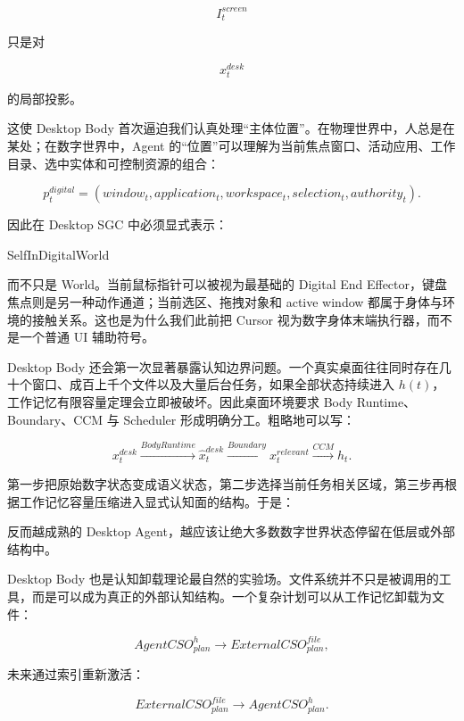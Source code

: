 $$
I_t^{screen}
$$

只是对

$$
x_t^{desk}
$$

的局部投影。

这使 Desktop Body 首次逼迫我们认真处理“主体位置”。在物理世界中，人总是在某处；在数字世界中，Agent 的“位置”可以理解为当前焦点窗口、活动应用、工作目录、选中实体和可控制资源的组合：

$$
p_t^{digital}
=
(
window_t,
application_t,
workspace_t,
selection_t,
authority_t
).
$$

因此在 Desktop SGC 中必须显式表示：

\begin{statementbox}
SelfInDigitalWorld
\end{statementbox}

而不只是 World。当前鼠标指针可以被视为最基础的 Digital End Effector，键盘焦点则是另一种动作通道；当前选区、拖拽对象和 active window 都属于身体与环境的接触关系。这也是为什么我们此前把 Cursor 视为数字身体末端执行器，而不是一个普通 UI 辅助符号。

Desktop Body 还会第一次显著暴露认知边界问题。一个真实桌面往往同时存在几十个窗口、成百上千个文件以及大量后台任务，如果全部状态持续进入 $h(t)$，工作记忆有限容量定理会立即被破坏。因此桌面环境要求 Body Runtime、Boundary、CCM 与 Scheduler 形成明确分工。粗略地可以写：

$$
x_t^{desk}
\xrightarrow{BodyRuntime}
\hat x_t^{desk}
\xrightarrow{Boundary}
x_t^{relevant}
\xrightarrow{CCM}
h_t.
$$

第一步把原始数字状态变成语义状态，第二步选择当前任务相关区域，第三步再根据工作记忆容量压缩进入显式认知面的结构。于是：

\begin{statementbox}
\centering
{}
\end{statementbox}

反而越成熟的 Desktop Agent，越应该让绝大多数数字世界状态停留在低层或外部结构中。

Desktop Body 也是认知卸载理论最自然的实验场。文件系统并不只是被调用的工具，而是可以成为真正的外部认知结构。一个复杂计划可以从工作记忆卸载为文件：

$$
AgentCSO_{plan}^{h}
\rightarrow
ExternalCSO_{plan}^{file},
$$

未来通过索引重新激活：

$$
ExternalCSO_{plan}^{file}
\rightarrow
AgentCSO_{plan}^{h}.
$$

